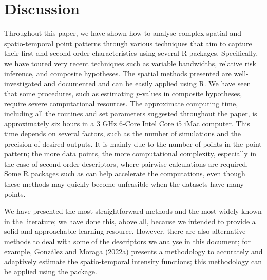\hypertarget{discussion}{%
\section{Discussion}\label{discussion}}

Throughout this paper, we have shown how to analyse complex spatial and spatio-temporal point patterns through various techniques that aim to capture their first and second-order characteristics using several R packages. Specifically, we have toured very recent techniques such as variable bandwidths, relative risk inference, and composite hypotheses. The spatial methods presented are well-investigated and documented and can be easily applied using R. We have seen that some procedures, such as estimating \(p\)-values in composite hypotheses, require severe computational resources. The approximate computing time, including all the routines and set parameters suggested throughout the paper, is approximately six hours in a 3 GHz 6-Core Intel Core i5 iMac computer. This time depends on several factors, such as the number of simulations and the precision of desired outputs. It is mainly due to the number of points in the point pattern; the more data points, the more computational complexity, especially in the case of second-order descriptors, where pairwise calculations are required. Some R packages such as  can help accelerate the computations, even though these methods may quickly become unfeasible when the datasets have many points.

We have presented the most straightforward methods and the most widely known in the literature; we have done this, above all, because we intended to provide a solid and approachable learning resource. However, there are also alternative methods to deal with some of the descriptors we analyse in this document; for example, González and Moraga (2022a) presents a methodology to accurately and adaptively estimate the spatio-temporal intensity functions; this methodology can be applied using the  package.

